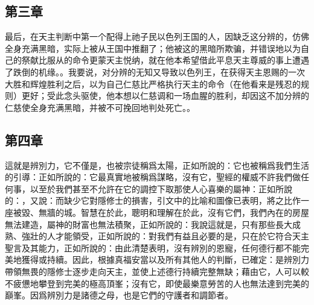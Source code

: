 
\subsection{第三章}

\par

最后，在天主判断中第一个配得上祂子民以色列王国的人，因缺乏这分辨的，仿佛全身充满黑暗，实际上被从王国中推翻了；他被这的黑暗所欺骗，并错误地以为自己的祭献比服从的命令更蒙天主悦纳，就在他本希望借此平息天主尊威的事上遭遇了跌倒的机缘。。我要说，对分辨的无知又导致以色列王，在获得天主恩赐的一次大胜和辉煌胜利之后，以为自己仁慈比严格执行天主的命令（在他看来是残忍的规则）更好；受此念头驱使，他本想以仁慈调和一场血腥的胜利，却因这不加分辨的仁慈使全身充满黑暗，并被不可挽回地判处死亡。。\par


\subsection{第四章}

\par

這就是辨別力，它不僅是，也被宗徒稱爲太陽，正如所說的：它也被稱爲我們生活的引導：正如所說的：它最真實地被稱爲謀略，沒有它，聖經的權威不許我們做任何事，以至於我們甚至不允許在它的調控下取那使人心喜樂的屬神：正如所說的：，又說：而缺少它對隱修士的損害，引文中的比喻和圖像已表明，將之比作一座被毀、無牆的城。智慧在於此，聰明和理解在於此，沒有它們，我們內在的房屋無法建造，屬神的財富也無法積聚，正如所說的：我說這就是，只有那些長大成熟、強壯的人才能領受，正如所說的：對我們有益且必要的是，只在於它符合天主聖言及其能力，正如所說的：由此清楚表明，沒有辨別的恩寵，任何德行都不能完美地獲得或持續。因此，根據真福安當以及所有其他人的判斷，已確定：是辨別力帶領無畏的隱修士逐步走向天主，並使上述德行持續完整無缺；藉由它，人可以較不疲憊地攀登到完美的極高頂峯；沒有它，即使最樂意勞苦的人也無法達到完美的巔峯。因爲辨別力是諸德之母，也是它們的守護者和調節者。\par

